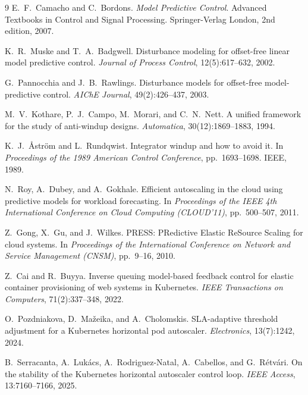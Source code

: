 \documentclass[smallextended]{svjour3}
\begin{document}
\begin{thebibliography}{9}
E.\ F.\ Camacho and C.\ Bordons.
\newblock \emph{Model Predictive Control}.
\newblock Advanced Textbooks in Control and Signal Processing.
  Springer-Verlag London, 2nd edition, 2007.

K.\ R.\ Muske and T.\ A.\ Badgwell.
\newblock Disturbance modeling for offset-free linear model predictive
  control.
\newblock \emph{Journal of Process Control}, 12(5):617--632, 2002.

G.\ Pannocchia and J.\ B.\ Rawlings.
\newblock Disturbance models for offset-free model-predictive control.
\newblock \emph{AIChE Journal}, 49(2):426--437, 2003.

M.\ V.\ Kothare, P.\ J.\ Campo, M.\ Morari, and C.\ N.\ Nett.
\newblock A unified framework for the study of anti-windup designs.
\newblock \emph{Automatica}, 30(12):1869--1883, 1994.

K.\ J.\ {\AA}str\"om and L.\ Rundqwist.
\newblock Integrator windup and how to avoid it.
\newblock In \emph{Proceedings of the 1989 American Control
  Conference}, pp.\ 1693--1698. IEEE, 1989.

N.\ Roy, A.\ Dubey, and A.\ Gokhale.
\newblock Efficient autoscaling in the cloud using predictive models
  for workload forecasting.
\newblock In \emph{Proceedings of the IEEE 4th International
  Conference on Cloud Computing (CLOUD'11)}, pp.\ 500--507, 2011.

Z.\ Gong, X.\ Gu, and J.\ Wilkes.
\newblock PRESS: PRedictive Elastic ReSource Scaling for cloud
  systems.
\newblock In \emph{Proceedings of the International Conference on
  Network and Service Management (CNSM)}, pp.\ 9--16, 2010.

Z.\ Cai and R.\ Buyya.
\newblock Inverse queuing model-based feedback control for elastic
  container provisioning of web systems in Kubernetes.
\newblock \emph{IEEE Transactions on Computers}, 71(2):337--348, 2022.

O.\ Pozdniakova, D.\ Ma\v{z}eika, and A.\ Cholomskis.
\newblock SLA-adaptive threshold adjustment for a Kubernetes
  horizontal pod autoscaler.
\newblock \emph{Electronics}, 13(7):1242, 2024.

B.\ Serracanta, A.\ Luk\'acs, A.\ Rodriguez-Natal, A.\ Cabellos, and
  G.\ R\'etv\'ari.
\newblock On the stability of the Kubernetes horizontal autoscaler
  control loop.
\newblock \emph{IEEE Access}, 13:7160--7166, 2025.


\end{thebibliography}
\end{document}
